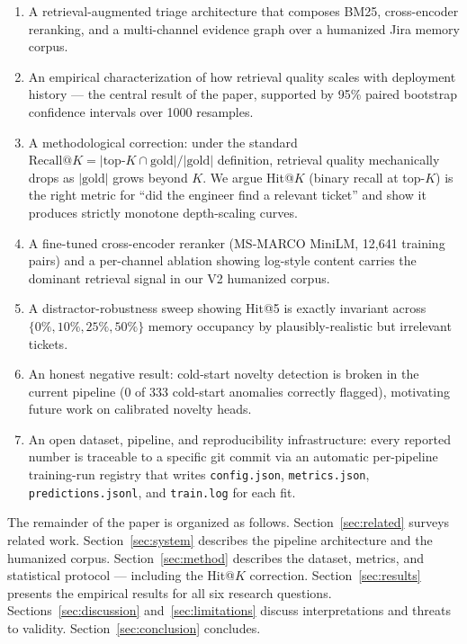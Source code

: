 \begin{enumerate}
    \item A retrieval-augmented triage architecture that composes BM25, cross-encoder reranking, and a multi-channel evidence graph over a humanized Jira memory corpus.
    \item An empirical characterization of how retrieval quality scales with deployment history --- the central result of the paper, supported by 95\% paired bootstrap confidence intervals over 1000 resamples.
    \item A methodological correction: under the standard $\text{Recall@}K = |\text{top-}K \cap \text{gold}| / |\text{gold}|$ definition, retrieval quality mechanically drops as $|\text{gold}|$ grows beyond $K$. We argue Hit@$K$ (binary recall at top-$K$) is the right metric for ``did the engineer find a relevant ticket'' and show it produces strictly monotone depth-scaling curves.
    \item A fine-tuned cross-encoder reranker (MS-MARCO MiniLM, 12{,}641 training pairs) and a per-channel ablation showing log-style content carries the dominant retrieval signal in our V2 humanized corpus.
    \item A distractor-robustness sweep showing Hit@5 is exactly invariant across $\{0\%, 10\%, 25\%, 50\%\}$ memory occupancy by plausibly-realistic but irrelevant tickets.
    \item An honest negative result: cold-start novelty detection is broken in the current pipeline (0 of 333 cold-start anomalies correctly flagged), motivating future work on calibrated novelty heads.
    \item An open dataset, pipeline, and reproducibility infrastructure: every reported number is traceable to a specific git commit via an automatic per-pipeline training-run registry that writes \texttt{config.json}, \texttt{metrics.json}, \texttt{predictions.jsonl}, and \texttt{train.log} for each fit.
\end{enumerate}

The remainder of the paper is organized as follows. Section~\ref{sec:related} surveys related work. Section~\ref{sec:system} describes the pipeline architecture and the humanized corpus. Section~\ref{sec:method} describes the dataset, metrics, and statistical protocol --- including the Hit@$K$ correction. Section~\ref{sec:results} presents the empirical results for all six research questions. Sections~\ref{sec:discussion} and~\ref{sec:limitations} discuss interpretations and threats to validity. Section~\ref{sec:conclusion} concludes.
